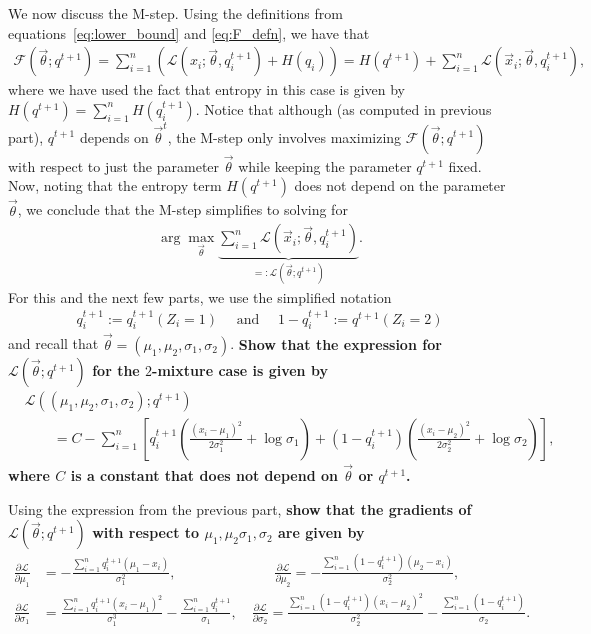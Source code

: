\documentclass[preview]{standalone}
\begin{document}
\begin{Parts}
\Part We now discuss the M-step. Using the definitions from equations~\eqref{eq:lower_bound} and \eqref{eq:F_defn}, we have that
\begin{align*}
  \mathcal{F}(\vec{\theta}; q^{t+1}) = 
  \sum_{i=1}^n(\mathcal{L}(x_i; \vec\theta, q_i^{t+1})
    + H(q_i))
  = H(q^{t+1}) + \sum_{i=1}^n\mathcal{L}(\vec x_i; \vec\theta, q_i^{t+1}),
\end{align*}
where we have used the fact that entropy in this case is given by $H(q^{t+1}) = \sum_{i=1}^nH(q_i^{t+1})$.
Notice that although (as computed in previous part), $q^{t+1}$ depends
on $\vec\theta^t$, the M-step only involves maximizing $\mathcal{F}(\vec{\theta}; q^{t+1})$
with respect to just the parameter $\vec\theta$ while keeping the 
parameter $q^{t+1}$ fixed.
Now, noting that the entropy term $H(q^{t+1})$ does not depend on 
the parameter $\vec\theta$, we conclude that the M-step simplifies to solving for
\begin{align*}
  \arg\max_{\vec\theta} \underbrace{\sum_{i=1}^n\mathcal{L}(\vec x_i; \vec\theta, q_i^{t+1})}_{=:\mathcal{L}(\vec{\theta}; q^{t+1})} .
\end{align*}
For this and the next few parts, we use the simplified notation
\begin{align*}
  q^{t+1}_i:= q_i^{t+1}(Z_i=1) \quad\text{ and } \quad  1-q^{t+1}_i:= q^{t+1}(Z_i=2)
\end{align*}
and recall that $\vec \theta = (\mu_1, \mu_2, \sigma_1, \sigma_2)$.
{\bf Show that the expression for $\mathcal{L}(\vec{\theta}; q^{t+1})$ for the $2$-mixture case is given by
\begin{align*}
  &\mathcal{L}((\mu_1, \mu_2, \sigma_1, \sigma_2); q^{t+1}) \\
        &\quad\quad=  C- \sum_{i=1}^n\left[q^{t+1}_i  \left(\frac{(x_i-\mu_1)^2}{2\sigma_1^2}+\log \sigma_1\right) + (1-q_i^{t+1}) \left(\frac{(x_i-\mu_2)^2}{2\sigma_2^2}+\log \sigma_2\right)\right],
\end{align*}
where $C$ is a constant that does not depend on $\vec\theta$ or $q^{t+1}$.}

\Part Using the expression from the previous part, {\bf show that the gradients of $\mathcal{L}(\vec{\theta}; q^{t+1})$ with respect to $\mu_1, \mu_2
\sigma_1, \sigma_2$ are given by}
\begin{align*}
  \frac{\partial \mathcal{L}}{\partial\mu_1} &= -\frac{\sum_{i=1}^n q_i^{t+1}(\mu_1-x_i)}{\sigma_1^2},\quad\quad\quad\quad\quad\quad\quad
  \frac{\partial \mathcal{L}}{\partial\mu_2} = -\frac{\sum_{i=1}^n (1-q_i^{t+1})(\mu_2-x_i)}{\sigma_2^2},\\
  \frac{\partial \mathcal{L}}{\partial\sigma_1} &= \frac{\sum_{i=1}^n q_i^{t+1}(x_i-\mu_1)^2}{\sigma_1^3}-\frac{\sum_{i=1}^n q_i^{t+1}}{\sigma_1}, \quad
  \frac{\partial \mathcal{L}}{\partial\sigma_2} = \frac{\sum_{i=1}^n (1-q_i^{t+1})(x_i-\mu_2)^2}{\sigma_2^2}-\frac{\sum_{i=1}^n (1-q_i^{t+1})}{\sigma_2}.
\end{align*}


\end{Parts}
\end{document}
